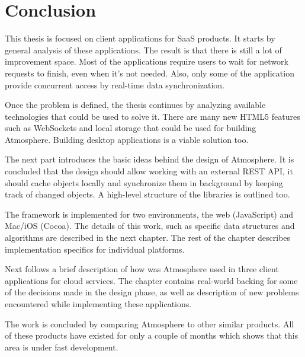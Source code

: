 \section{Conclusion}

This thesis is focused on client applications for SaaS products. It starts by general analysis of these applications. The result is that there is still a lot of improvement space. Most of the applications require users to wait for network requests to finish, even when it's not needed. Also, only some of the application provide concurrent access by real-time data synchronization.

Once the problem is defined, the thesis continues by analyzing available technologies that could be used to solve it. There are many new HTML5 features such as WebSockets and local storage that could be used for building Atmosphere. Building desktop applications is a viable solution too.

The next part introduces the basic ideas behind the design of Atmosphere. It is concluded that the design should allow working with an external REST API, it should cache objects locally and synchronize them in background by keeping track of changed objects. A high-level structure of the libraries is outlined too.

The framework is implemented for two environments, the web (JavaScript) and Mac/iOS (Cocoa). The details of this work, such as specific data structures and algorithms are described in the next chapter. The rest of the chapter describes implementation specifics for individual platforms.

Next follows a brief description of how was Atmosphere used in three client applications for cloud services. The chapter contains real-world backing for some of the decisions made in the design phase, as well as description of new problems encountered while implementing these applications.

The work is concluded by comparing Atmosphere to other similar products. All of these products have existed for only a couple of months which shows that this area is under fast development.